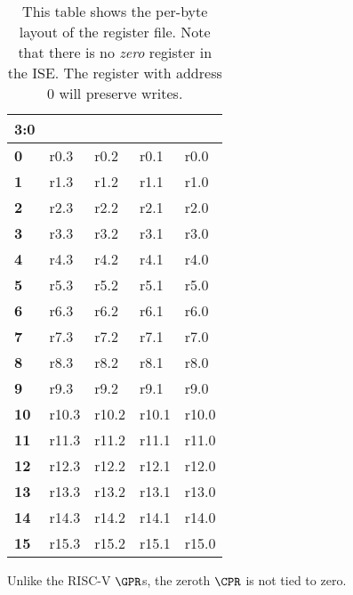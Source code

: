 \begin{table}[h!]
\centering
\begin{tabular}{|l|l l l l|}
\hline
\multicolumn{1}{|l|}{3:0} & \textbf{ } & \textbf{ } & \textbf{ } & \textbf{ } \\ \hline
\textbf{0 }   & r0.3       & r0.2       & r0.1       & r0.0       \\ \hline
\textbf{1 }   & r1.3       & r1.2       & r1.1       & r1.0       \\ \hline
\textbf{2 }   & r2.3       & r2.2       & r2.1       & r2.0       \\ \hline
\textbf{3 }   & r3.3       & r3.2       & r3.1       & r3.0       \\ \hline
\textbf{4 }   & r4.3       & r4.2       & r4.1       & r4.0       \\ \hline
\textbf{5 }   & r5.3       & r5.2       & r5.1       & r5.0       \\ \hline
\textbf{6 }   & r6.3       & r6.2       & r6.1       & r6.0       \\ \hline
\textbf{7 }   & r7.3       & r7.2       & r7.1       & r7.0       \\ \hline
\textbf{8 }   & r8.3       & r8.2       & r8.1       & r8.0       \\ \hline
\textbf{9 }   & r9.3       & r9.2       & r9.1       & r9.0       \\ \hline
\textbf{10}   & r10.3      & r10.2      & r10.1      & r10.0      \\ \hline
\textbf{11}   & r11.3      & r11.2      & r11.1      & r11.0      \\ \hline
\textbf{12}   & r12.3      & r12.2      & r12.1      & r12.0      \\ \hline
\textbf{13}   & r13.3      & r13.2      & r13.1      & r13.0      \\ \hline
\textbf{14}   & r14.3      & r14.2      & r14.1      & r14.0      \\ \hline
\textbf{15}   & r15.3      & r15.2      & r15.1      & r15.0      \\ \hline
\end{tabular}
\caption{This table shows the per-byte layout of the register file. Note
that there is no {\em zero} register in the ISE. The register with
address $0$ will preserve writes.}
\label{tab:state-addr}
\end{table}

Unlike the RISC-V $\GPR$s, the zeroth $\CPR$ is not tied to zero.


